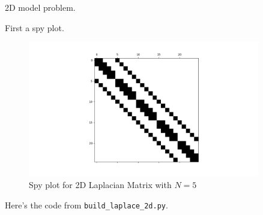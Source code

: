 \documentclass[boxes,pages]{homework}
\begin{document}

\begin{problem}
2D model problem.
\end{problem}

\begin{solution}
	First a spy plot.
	\begin{figure}[h]
		\centering
		\includegraphics[width=0.9\textwidth]{problemThree/spy.png}
		\caption{Spy plot for 2D Laplacian Matrix with $N = 5$}
	\end{figure}

	Here's the code from \verb|build_laplace_2d.py|.
	

\end{solution}
\end{document}
